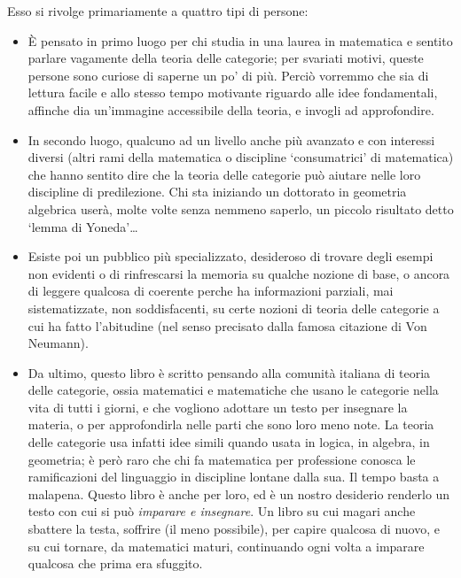 Esso si rivolge primariamente a quattro tipi di persone:
\begin{itemize}
	\item \`E pensato in primo luogo per chi studia in una laurea in matematica e sentito parlare vagamente della teoria delle categorie; per svariati motivi, queste persone sono curiose di saperne un po' di più. Perciò vorremmo che sia di lettura facile e allo stesso tempo motivante riguardo alle idee fondamentali, affinche dia un'immagine accessibile della teoria, e invogli ad approfondire.
	\item In secondo luogo, qualcuno ad un livello anche più avanzato e con interessi diversi (altri rami della matematica o discipline `consumatrici' di matematica) che hanno sentito dire che la teoria delle categorie pu\`o aiutare nelle loro discipline di predilezione. Chi sta iniziando un dottorato in geometria algebrica userà, molte volte senza nemmeno saperlo, un piccolo risultato detto `lemma di Yoneda'\dots
	\item Esiste poi un pubblico pi\`u specializzato, desideroso di trovare degli esempi non evidenti o di rinfrescarsi la memoria su qualche nozione di base, o ancora di leggere qualcosa di coerente perche ha informazioni parziali, mai sistematizzate, non soddisfacenti, su certe nozioni di teoria delle categorie a cui ha fatto l'abitudine (nel senso precisato dalla famosa citazione di Von Neumann).
	\item Da ultimo, questo libro è scritto pensando alla comunità italiana di teoria delle categorie, ossia matematici e matematiche che usano le categorie nella vita di tutti i giorni, e che vogliono adottare un testo per insegnare la materia, o per approfondirla nelle parti che sono loro meno note. La teoria delle categorie usa infatti idee simili quando usata in logica, in algebra, in geometria; è però raro che chi fa matematica per professione conosca le ramificazioni del linguaggio in discipline lontane dalla sua. Il tempo basta a malapena. Questo libro è anche per loro, ed è un nostro desiderio renderlo un testo con cui si può \emph{imparare e insegnare}. Un libro su cui magari anche sbattere la testa, soffrire (il meno possibile), per capire qualcosa di nuovo, e su cui tornare, da matematici maturi, continuando ogni volta a imparare qualcosa che prima era sfuggito.
\end{itemize}
\Todo{}

